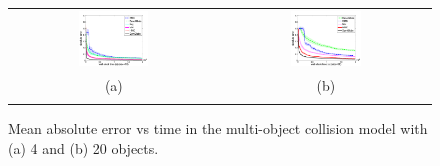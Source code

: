 \documentclass[letterpaper]{article}
\newcommand{\nnn}{0.35}
\begin{document}
\begin{figure}[t!]
\vspace{-0mm}
\begin{center}
\begin{tabular}{cc}
   \hspace{-5mm} \includegraphics[width=\nnn\textwidth]{../plotsx/collisionx/err-vs-time__param5-shaded.pdf} 
& \hspace{-3mm} \includegraphics[width=\nnn\textwidth]{../plotsx/collisionx/err-vs-time__param15-shaded.pdf} 
\vspace{-1.5mm}
\\
\hspace{-5mm} \footnotesize(a) 
& \hspace{-4mm} \footnotesize(b) 
\\
\multicolumn{2}{c}{}
\end{tabular}
\end{center}
\vspace{-7mm}
\caption{\footnotesize 
Mean absolute error vs time in the multi-object collision model with (a) 4 and (b) 20 objects.}
\label{fig:multi-object.mom}
\vspace{-2mm}
\end{figure}
\end{document}
